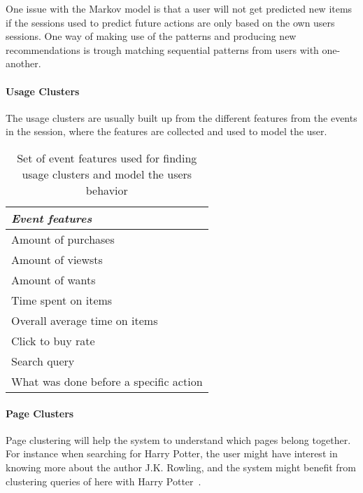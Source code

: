     One issue with the Markov model is that a user will not get predicted new items if the sessions used to predict future actions are only based on the own users sessions.
    One way of making use of the patterns and producing new recommendations is trough matching sequential patterns from users with one-another. 

\paragraph{Usage Clusters} %
    \label{subp:usage_clusters}
    The usage clusters are usually built up from the different features from the events in the session, where the features are collected and used to model the user.

    \begin{table}[H]
        \centering
        \begin{tabular}{l}
            \emph{Event features} \\ \hline
            Amount of purchases  \\ \hline
            Amount of viewsts  \\ \hline
            Amount of wants  \\ \hline
            Time spent on items \\ \hline
            Overall average time on items  \\ \hline
            Click to buy rate  \\ \hline
            Search query~\cite{Zhang:2006:MSE:1135777.1136004}  \\ \hline
            What was done before a specific action  \\ \hline
        \end{tabular}
        \caption[Event Features]{Set of event features used for finding usage clusters and model the users behavior}
        \label{table:uasageCluster}
    \end{table}

\paragraph{Page Clusters} %
    \label{subp:page_clusters}
    Page clustering will help the system to understand which pages belong together.
    For instance when searching for Harry Potter, the user might have interest in knowing more about the author J.K. Rowling, and the system might benefit from clustering queries of here with Harry Potter~\cite{Zhang:2006:MSE:1135777.1136004}.

